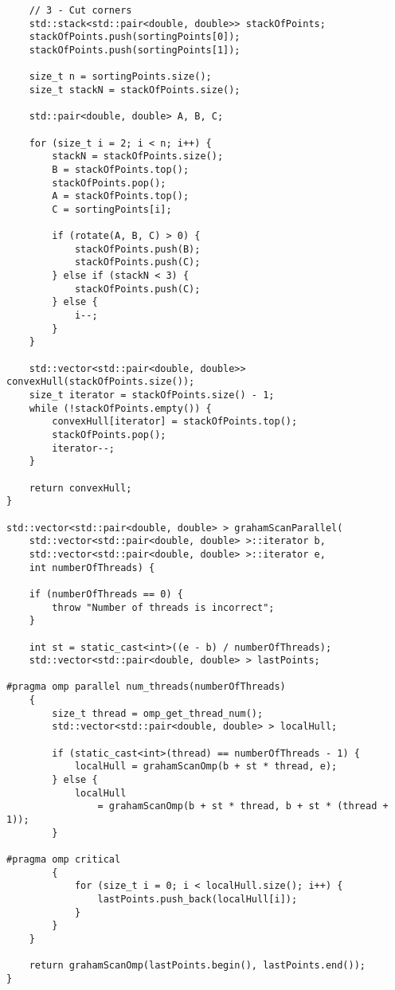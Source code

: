 \documentclass{report}
\begin{document}
\begin{lstlisting}
    // 3 - Cut corners
    std::stack<std::pair<double, double>> stackOfPoints;
    stackOfPoints.push(sortingPoints[0]);
    stackOfPoints.push(sortingPoints[1]);

    size_t n = sortingPoints.size();
    size_t stackN = stackOfPoints.size();

    std::pair<double, double> A, B, C;

    for (size_t i = 2; i < n; i++) {
        stackN = stackOfPoints.size();
        B = stackOfPoints.top();
        stackOfPoints.pop();
        A = stackOfPoints.top();
        C = sortingPoints[i];

        if (rotate(A, B, C) > 0) {
            stackOfPoints.push(B);
            stackOfPoints.push(C);
        } else if (stackN < 3) {
            stackOfPoints.push(C);
        } else {
            i--;
        }
    }

    std::vector<std::pair<double, double>> convexHull(stackOfPoints.size());
    size_t iterator = stackOfPoints.size() - 1;
    while (!stackOfPoints.empty()) {
        convexHull[iterator] = stackOfPoints.top();
        stackOfPoints.pop();
        iterator--;
    }

    return convexHull;
}

std::vector<std::pair<double, double> > grahamScanParallel(
    std::vector<std::pair<double, double> >::iterator b,
    std::vector<std::pair<double, double> >::iterator e,
    int numberOfThreads) {

    if (numberOfThreads == 0) {
        throw "Number of threads is incorrect";
    }

    int st = static_cast<int>((e - b) / numberOfThreads);
    std::vector<std::pair<double, double> > lastPoints;

#pragma omp parallel num_threads(numberOfThreads)
    {
        size_t thread = omp_get_thread_num();
        std::vector<std::pair<double, double> > localHull;

        if (static_cast<int>(thread) == numberOfThreads - 1) {
            localHull = grahamScanOmp(b + st * thread, e);
        } else {
            localHull
                = grahamScanOmp(b + st * thread, b + st * (thread + 1));
        }

#pragma omp critical
        {
            for (size_t i = 0; i < localHull.size(); i++) {
                lastPoints.push_back(localHull[i]);
            }
        }
    }

    return grahamScanOmp(lastPoints.begin(), lastPoints.end());
}
\end{lstlisting}
\end{document}
